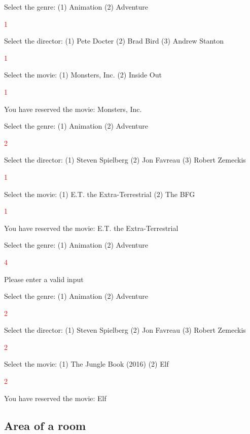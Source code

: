 \begin{sample}
Select the genre: (1) Animation (2) Adventure

\textcolor{red}{1}

Select the director: (1) Pete Docter (2) Brad Bird (3) Andrew Stanton

\textcolor{red}{1}

Select the movie: (1) Monsters, Inc. (2) Inside Out

\textcolor{red}{1}

You have reserved the movie: Monsters, Inc.
\end{sample}

\begin{sample}
Select the genre: (1) Animation (2) Adventure

\textcolor{red}{2}

Select the director: (1) Steven Spielberg (2) Jon Favreau (3) Robert Zemeckis

\textcolor{red}{1}

Select the movie: (1) E.T. the Extra-Terrestrial (2) The BFG

\textcolor{red}{1}

You have reserved the movie: E.T. the Extra-Terrestrial

\end{sample}

\begin{sample}
Select the genre: (1) Animation (2) Adventure

\textcolor{red}{4}

 Please enter a valid input
\end{sample}

\begin{sample}
Select the genre: (1) Animation (2) Adventure

\textcolor{red}{2}

Select the director: (1) Steven Spielberg (2) Jon Favreau (3) Robert Zemeckis

\textcolor{red}{2}

Select the movie: (1) The Jungle Book (2016) (2) Elf

\textcolor{red}{2}

You have reserved the movie: Elf
\end{sample}












\subsection{Area of a room}

